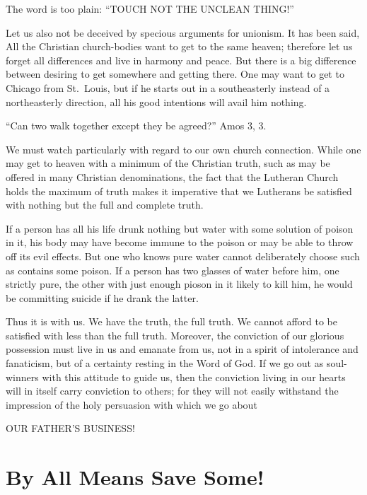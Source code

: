 \documentclass[
]{book}
\begin{document}
The word is too plain: ``TOUCH NOT THE UNCLEAN THING!''

Let us also not be deceived by specious arguments for unionism. It has been said, All the Christian church-bodies want to get to the same heaven; therefore let us forget all differences and live in harmony and peace. But there is a big difference between desiring to get somewhere and getting there. One may want to get to Chicago from St.~Louis, but if he starts out in a southeasterly instead of a northeasterly direction, all his good intentions will avail him nothing.

``Can two walk together except they be agreed?'' Amos 3, 3.

We must watch particularly with regard to our own church connection. While one may get to heaven with a minimum of the Christian truth, such as may be offered in many Christian denominations, the fact that the Lutheran Church holds the maximum of truth makes it imperative that we Lutherans be satisfied with nothing but the full and complete truth.

If a person has all his life drunk nothing but water with some solution of poison in it, his body may have become immune to the poison or may be able to throw off its evil effects. But one who knows pure water cannot deliberately choose such as contains some poison. If a person has two glasses of water before him, one strictly pure, the other with just enough pioson in it likely to kill him, he would be committing suicide if he drank the latter.

Thus it is with us. We have the truth, the full truth. We cannot afford to be satisfied with less than the full truth. Moreover, the conviction of our glorious possession must live in us and emanate from us, not in a spirit of intolerance and fanaticism, but of a certainty resting in the Word of God. If we go out as soul-winners with this attitude to guide us, then the conviction living in our hearts will in itself carry conviction to others; for they will not easily withstand the impression of the holy persuasion with which we go about

\begin{center} OUR FATHER'S BUSINESS! \end{center}

\chapter{By All Means Save Some!}\label{by-all-means-save-some}
\end{document}
